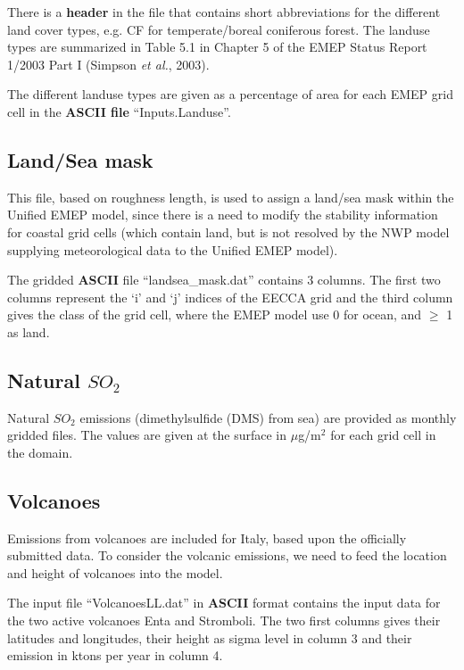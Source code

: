 There is a {\bf header} in the file that contains short abbreviations 
for the different land cover
types, e.g. CF for temperate/boreal coniferous forest. The landuse
types are summarized in Table 5.1 in Chapter 5 of the EMEP Status
Report 1/2003 Part I (Simpson {\sl et al.}, 2003).

The different landuse types are given as a percentage of area for each 
EMEP grid cell in the {\bf ASCII file} ``Inputs.Landuse''. 



\subsection{Land/Sea mask}
This file, based on   roughness length, is used
to assign a land/sea mask within the Unified EMEP model, since there is
a need to modify the stability information for coastal grid cells
(which contain land, but is not resolved by the NWP model supplying 
meteorological data to the Unified EMEP model). 

The gridded {\bf ASCII} file ``landsea\_mask.dat'' contains 3 columns. 
The first two columns represent the `i' and `j' indices of the EECCA
grid and the third column gives the class of the grid cell, where the 
EMEP model use 0 for ocean, and $\geq$ 1 as land.



\subsection{Natural $SO_2$}
Natural $SO_2$ emissions (dimethylsulfide (DMS) from sea) are provided 
as monthly gridded files.  
The values are given at the surface in $\mu$g/m$^2$ for each grid cell in the domain. 

\subsection{Volcanoes}

Emissions from volcanoes are included for Italy, based upon the
officially submitted data.
To consider the volcanic emissions, we need to feed the location
and height of volcanoes into the model. 

The input file ``VolcanoesLL.dat'' in {\bf ASCII} format contains the input data for the two active volcanoes
 Enta and Stromboli. The two first columns gives their latitudes and longitudes, their height as sigma level
 in column 3 and their emission in ktons per year in column 4. 

